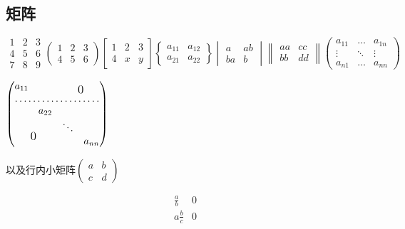 \documentclass[10pt]{ctexart}%
\begin{document}
	\subsection{矩阵}
	$
	\begin{matrix}
		1&2&3\\
		4&5&6\\
		7&8&9
	\end{matrix}
	\begin{pmatrix}
        1&2&3\\
        4&5&6
	\end{pmatrix}
	\begin{bmatrix}
	    1&2&3\\
	    4&x&y
	\end{bmatrix}
	\begin{Bmatrix}
	    a_{11}&a_{12}\\
	    a_{21}&a_{22}
	\end{Bmatrix}
	\begin{vmatrix}
        a&ab\\
        ba&b
	\end{vmatrix}
	\begin{Vmatrix}
	    aa&cc\\
	    bb&dd
	\end{Vmatrix}
	\begin{pmatrix}
	    a_{11}&\dots &a_{1n}\\
	    \vdots&\ddots&\vdots\\
	    a_{n1}&\dots &a_{nn}
	\end{pmatrix}
	$
	
	$
	\begin{pmatrix}
	    a_{11}&       &\multicolumn{2}{c}{\raisebox{-1ex}[0 pt]{\large 0}}\\
	    \hdotsfor{4}\\%
	          &a_{22} &         &       \\
	          &       &\ddots   &       \\
	   \multicolumn{2}{c}{\raisebox{1ex}[0 pt]{\large 0}}&    &a_{nn}       
	\end{pmatrix}%
	$
	
	以及行内小矩阵\(\left(\begin{smallmatrix}
	a&b\\
	c&d
	\end{smallmatrix}\right)\)
	
	\[\begin{array}{|r|r|}%
	\frac{a}{b} &0\\
	\hline
	a\frac{b}{c}&0
	\end{array}\]
	
\end{document}
